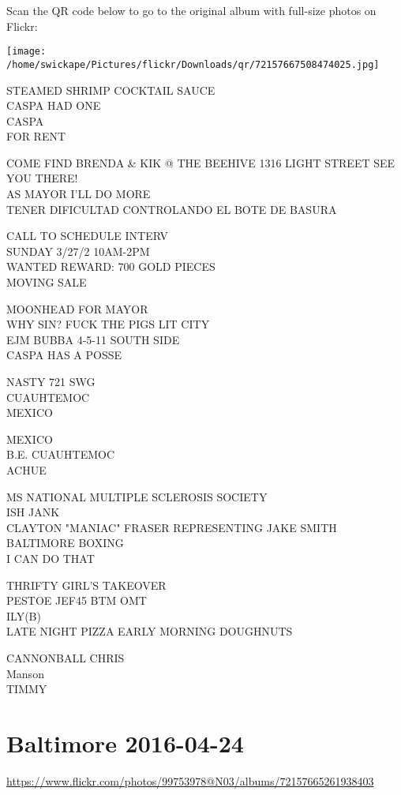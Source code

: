 \documentclass[10pt,letterpaper]{article}
\begin{document}
Scan the QR code below to go to the original album with full-size photos on Flickr:

\texttt{[image: /home/swickape/Pictures/flickr/Downloads/qr/72157667508474025.jpg]}


STEAMED SHRIMP COCKTAIL SAUCE\\
CASPA HAD ONE\\
CASPA\\
FOR RENT

COME FIND BRENDA \& KIK @ THE BEEHIVE 1316 LIGHT STREET SEE YOU THERE!\\
AS MAYOR I'LL DO MORE\\
TENER DIFICULTAD CONTROLANDO EL BOTE DE BASURA

CALL TO SCHEDULE INTERV\\
SUNDAY 3/27/2 10AM{-}2PM\\
WANTED REWARD: 700 GOLD PIECES\\
MOVING SALE

MOONHEAD FOR MAYOR\\
WHY SIN?  FUCK THE PIGS LIT CITY\\
EJM BUBBA 4{-}5{-}11 SOUTH SIDE\\
CASPA HAS A POSSE

NASTY 721 SWG\\
CUAUHTEMOC\\
MEXICO

MEXICO\\
B.E. CUAUHTEMOC\\
ACHUE

MS NATIONAL MULTIPLE SCLEROSIS SOCIETY\\
ISH JANK\\
CLAYTON "MANIAC" FRASER REPRESENTING JAKE SMITH BALTIMORE BOXING\\
I CAN DO THAT

THRIFTY GIRL'S TAKEOVER\\
PESTOE JEF45 BTM OMT\\
ILY(B)\\
LATE NIGHT PIZZA EARLY MORNING DOUGHNUTS

CANNONBALL CHRIS\\
Manson\\
TIMMY


\section*{Baltimore 2016-04-24}

\url{https://www.flickr.com/photos/99753978@N03/albums/72157665261938403}
\end{document}

